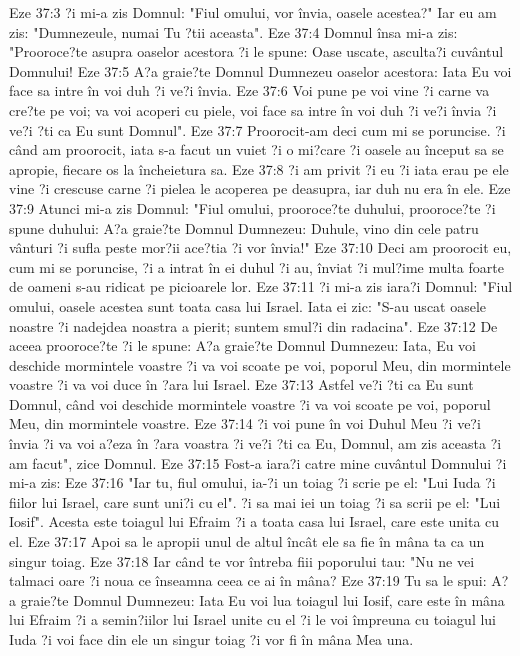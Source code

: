 Eze 37:3  ?i mi-a zis Domnul: "Fiul omului, vor învia, oasele acestea?" Iar eu am zis: "Dumnezeule, numai Tu ?tii aceasta".
Eze 37:4  Domnul însa mi-a zis: "Prooroce?te asupra oaselor acestora ?i le spune: Oase uscate, asculta?i cuvântul Domnului!
Eze 37:5  A?a graie?te Domnul Dumnezeu oaselor acestora: Iata Eu voi face sa intre în voi duh ?i ve?i învia.
Eze 37:6  Voi pune pe voi vine ?i carne va cre?te pe voi; va voi acoperi cu piele, voi face sa intre în voi duh ?i ve?i învia ?i ve?i ?ti ca Eu sunt Domnul".
Eze 37:7  Proorocit-am deci cum mi se poruncise. ?i când am proorocit, iata s-a facut un vuiet ?i o mi?care ?i oasele au început sa se apropie, fiecare os la încheietura sa.
Eze 37:8  ?i am privit ?i eu ?i iata erau pe ele vine ?i crescuse carne ?i pielea le acoperea pe deasupra, iar duh nu era în ele.
Eze 37:9  Atunci mi-a zis Domnul: "Fiul omului, prooroce?te duhului, prooroce?te ?i spune duhului: A?a graie?te Domnul Dumnezeu: Duhule, vino din cele patru vânturi ?i sufla peste mor?ii ace?tia ?i vor învia!"
Eze 37:10  Deci am proorocit eu, cum mi se poruncise, ?i a intrat în ei duhul ?i au, înviat ?i mul?ime multa foarte de oameni s-au ridicat pe picioarele lor.
Eze 37:11  ?i mi-a zis iara?i Domnul: "Fiul omului, oasele acestea sunt toata casa lui Israel. Iata ei zic: "S-au uscat oasele noastre ?i nadejdea noastra a pierit; suntem smul?i din radacina".
Eze 37:12  De aceea prooroce?te ?i le spune: A?a graie?te Domnul Dumnezeu: Iata, Eu voi deschide mormintele voastre ?i va voi scoate pe voi, poporul Meu, din mormintele voastre ?i va voi duce în ?ara lui Israel.
Eze 37:13  Astfel ve?i ?ti ca Eu sunt Domnul, când voi deschide mormintele voastre ?i va voi scoate pe voi, poporul Meu, din mormintele voastre.
Eze 37:14  ?i voi pune în voi Duhul Meu ?i ve?i învia ?i va voi a?eza în ?ara voastra ?i ve?i ?ti ca Eu, Domnul, am zis aceasta ?i am facut", zice Domnul.
Eze 37:15  Fost-a iara?i catre mine cuvântul Domnului ?i mi-a zis:
Eze 37:16  "Iar tu, fiul omului, ia-?i un toiag ?i scrie pe el: "Lui Iuda ?i fiilor lui Israel, care sunt uni?i cu el". ?i sa mai iei un toiag ?i sa scrii pe el: "Lui Iosif". Acesta este toiagul lui Efraim ?i a toata casa lui Israel, care este unita cu el.
Eze 37:17  Apoi sa le apropii unul de altul încât ele sa fie în mâna ta ca un singur toiag.
Eze 37:18  Iar când te vor întreba fiii poporului tau: "Nu ne vei talmaci oare ?i noua ce înseamna ceea ce ai în mâna?
Eze 37:19  Tu sa le spui: A?a graie?te Domnul Dumnezeu: Iata Eu voi lua toiagul lui Iosif, care este în mâna lui Efraim ?i a semin?iilor lui Israel unite cu el ?i le voi împreuna cu toiagul lui Iuda ?i voi face din ele un singur toiag ?i vor fi în mâna Mea una.
